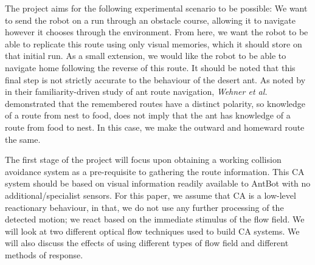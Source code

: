 \documentclass[a4paper,12pt,twoside,openright]{article}
\begin{document}
The project aims for the following experimental scenario to be possible: We want to send the robot
on a run through an obstacle course, allowing it to navigate however it chooses through the
environment. From here, we want the robot to be able to replicate this route using only visual
memories, which it should store on that initial run. As a small extension, we would like the robot to be able to 
navigate home following the reverse of this route. It should be noted that this final step is not
strictly accurate to the behaviour of the desert ant. As noted by \cite{Baddeley2012} in their
familiarity-driven study of ant route navigation, \textit{Wehner et al.} \cite{Wehner2006}
demonstrated that the remembered routes have a distinct polarity, so knowledge of a route from
nest to food, does not imply that the ant has knowledge of a route from food to nest. In this case,
we make the outward and homeward route the same.
\newline

The first stage of the project will focus upon obtaining a working collision avoidance system as a
pre-requisite to gathering the route information. This CA system should be based on visual
information readily available to AntBot with no additional/specialist sensors. For this paper, we
assume that CA is a low-level reactionary behaviour, in that, we do not use any further processing
of the detected motion; we react based on the immediate stimulus of the flow
field. We will look at two different optical flow techniques used to build CA systems. We will also
discuss the effects of using different types of flow field and different methods of response.
\newline
\end{document}
